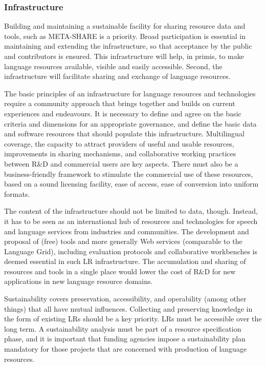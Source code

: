 \documentclass[10pt, plain]{../../metanetpaper}
\begin{document}
\begin{multicols}{2}
\subsubsection{Infrastructure}
\label{sec:infrastructure}

Building and maintaining a sustainable facility for sharing resource data and tools, such as META-SHARE is a priority. Broad participation is essential in maintaining and extending the infrastructure, so that acceptance by the public and contributors is ensured. This infrastructure will help, in primis, to make language resources available, visible and easily accessible. Second, the infrastructure will facilitate sharing and exchange of language resources. 

The basic principles of an infrastructure for language resources and technologies require a community approach that brings together and builds on current experiences and endeavours. It is necessary to define and agree on the basic criteria and dimensions for an appropriate governance, and define the basic data and software resources that should populate this infrastructure. Multilingual coverage, the capacity to attract providers of useful and usable resources, improvements in sharing mechanisms, and collaborative working practices between R\&D and commercial users are key aspects. There must also be a business-friendly framework to stimulate the commercial use of these resources, based on a sound licensing facility, ease of access, ease of conversion into uniform formats. 

The content of the infrastructure should not be limited to data, though. Instead, it has to be seen as an international hub of resources and technologies for speech and language services from industries and communities. The development and proposal of (free) tools and more generally Web services (comparable to the Language Grid), including evaluation protocols and collaborative workbenches is deemed essential in such LR infrastructure. The accumulation and sharing of resources and tools in a single place would lower the cost of R\&D for new applications in new language resource domains.

Sustainability covers preservation, accessibility, and operability (among other things) that all have mutual influences. Collecting and preserving knowledge in the form of existing LRs should be a key priority.
LRs must be accessible over the long term. A sustainability analysis must be part of a resource specification phase, and it is important that funding agencies impose a sustainability plan mandatory for those projects that are concerned with production of language resources.


\end{multicols}
\end{document}
